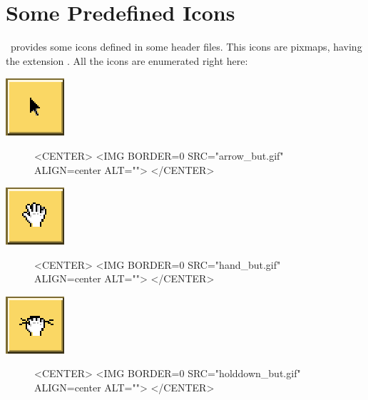 \section{Some Predefined Icons}
\label{The predefined icons}

\cgal\ provides some icons defined in some header files. This icons are
pixmaps, having the extension . All the icons are enumerated right
here:

\begin{ccTexOnly}
\mbox{\includegraphics{arrow_but.eps}}
\end{ccTexOnly}
\begin{figure}[h]
\begin{ccHtmlOnly}
<CENTER>
<IMG BORDER=0 SRC="arrow_but.gif"  ALIGN=center  ALT="">
</CENTER>
\end{ccHtmlOnly}
\end{figure}


\begin{ccTexOnly}
\mbox{\includegraphics{hand_but.eps}}
\end{ccTexOnly}
\begin{figure}
\begin{ccHtmlOnly}
<CENTER>
<IMG BORDER=0 SRC="hand_but.gif"  ALIGN=center  ALT="">
</CENTER>
\end{ccHtmlOnly}
\end{figure}

\begin{ccTexOnly}
\mbox{\includegraphics{holddown_but.eps}}
\end{ccTexOnly}
\begin{figure}
\begin{ccHtmlOnly}
<CENTER>
<IMG BORDER=0 SRC="holddown_but.gif"  ALIGN=center  ALT="">
</CENTER>
\end{ccHtmlOnly}
\end{figure}

